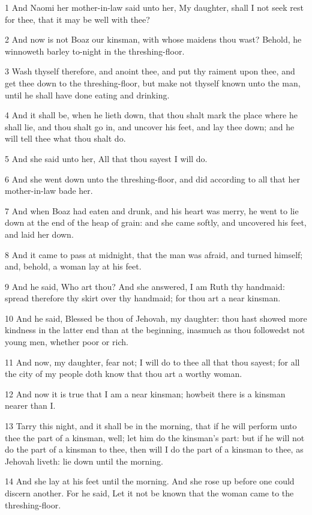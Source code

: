 \par 1 And Naomi her mother-in-law said unto her, My daughter, shall I not seek rest for thee, that it may be well with thee?
\par 2 And now is not Boaz our kinsman, with whose maidens thou wast? Behold, he winnoweth barley to-night in the threshing-floor.
\par 3 Wash thyself therefore, and anoint thee, and put thy raiment upon thee, and get thee down to the threshing-floor, but make not thyself known unto the man, until he shall have done eating and drinking.
\par 4 And it shall be, when he lieth down, that thou shalt mark the place where he shall lie, and thou shalt go in, and uncover his feet, and lay thee down; and he will tell thee what thou shalt do.
\par 5 And she said unto her, All that thou sayest I will do.
\par 6 And she went down unto the threshing-floor, and did according to all that her mother-in-law bade her.
\par 7 And when Boaz had eaten and drunk, and his heart was merry, he went to lie down at the end of the heap of grain: and she came softly, and uncovered his feet, and laid her down.
\par 8 And it came to pass at midnight, that the man was afraid, and turned himself; and, behold, a woman lay at his feet.
\par 9 And he said, Who art thou? And she answered, I am Ruth thy handmaid: spread therefore thy skirt over thy handmaid; for thou art a near kinsman.
\par 10 And he said, Blessed be thou of Jehovah, my daughter: thou hast showed more kindness in the latter end than at the beginning, inasmuch as thou followedst not young men, whether poor or rich.
\par 11 And now, my daughter, fear not; I will do to thee all that thou sayest; for all the city of my people doth know that thou art a worthy woman.
\par 12 And now it is true that I am a near kinsman; howbeit there is a kinsman nearer than I.
\par 13 Tarry this night, and it shall be in the morning, that if he will perform unto thee the part of a kinsman, well; let him do the kinsman's part: but if he will not do the part of a kinsman to thee, then will I do the part of a kinsman to thee, as Jehovah liveth: lie down until the morning.
\par 14 And she lay at his feet until the morning. And she rose up before one could discern another. For he said, Let it not be known that the woman came to the threshing-floor.
